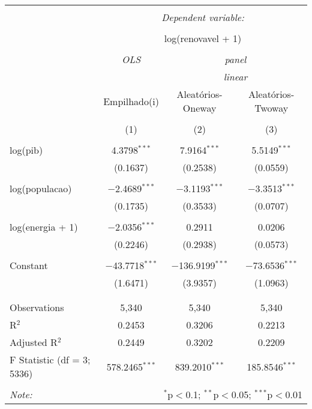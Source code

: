 
\begin{table}[!htbp] \centering 
  \caption{} 
  \label{} 
\begin{tabular}{@{\extracolsep{5pt}}lccc} 
\\[-1.8ex]\hline 
\hline \\[-1.8ex] 
 & \multicolumn{3}{c}{\textit{Dependent variable:}} \\ 
\cline{2-4} 
\\[-1.8ex] & \multicolumn{3}{c}{log(renovavel + 1)} \\ 
\\[-1.8ex] & \textit{OLS} & \multicolumn{2}{c}{\textit{panel}} \\ 
 & \textit{} & \multicolumn{2}{c}{\textit{linear}} \\ 
 & Empilhado(i) & Aleatórios-Oneway & Aleatórios-Twoway \\ 
\\[-1.8ex] & (1) & (2) & (3)\\ 
\hline \\[-1.8ex] 
 log(pib) & 4.3798$^{***}$ & 7.9164$^{***}$ & 5.5149$^{***}$ \\ 
  & (0.1637) & (0.2538) & (0.0559) \\ 
  & & & \\ 
 log(populacao) & $-$2.4689$^{***}$ & $-$3.1193$^{***}$ & $-$3.3513$^{***}$ \\ 
  & (0.1735) & (0.3533) & (0.0707) \\ 
  & & & \\ 
 log(energia + 1) & $-$2.0356$^{***}$ & 0.2911 & 0.0206 \\ 
  & (0.2246) & (0.2938) & (0.0573) \\ 
  & & & \\ 
 Constant & $-$43.7718$^{***}$ & $-$136.9199$^{***}$ & $-$73.6536$^{***}$ \\ 
  & (1.6471) & (3.9357) & (1.0963) \\ 
  & & & \\ 
\hline \\[-1.8ex] 
Observations & 5,340 & 5,340 & 5,340 \\ 
R$^{2}$ & 0.2453 & 0.3206 & 0.2213 \\ 
Adjusted R$^{2}$ & 0.2449 & 0.3202 & 0.2209 \\ 
F Statistic (df = 3; 5336) & 578.2465$^{***}$ & 839.2010$^{***}$ & 185.8546$^{***}$ \\ 
\hline 
\hline \\[-1.8ex] 
\textit{Note:}  & \multicolumn{3}{r}{$^{*}$p$<$0.1; $^{**}$p$<$0.05; $^{***}$p$<$0.01} \\ 
\end{tabular} 
\end{table} 
